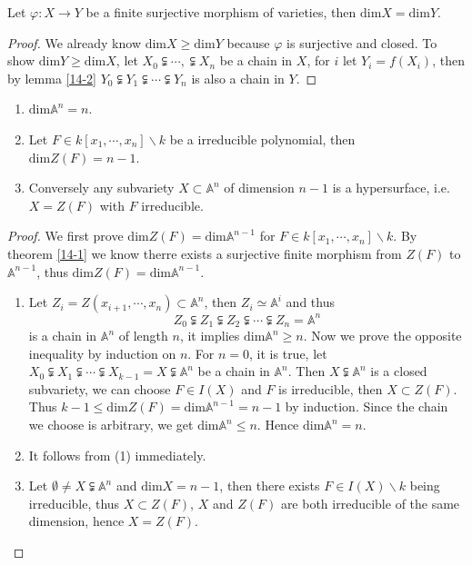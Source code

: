 \begin{theorem}
	Let $ \varphi:X\to Y $ be a finite surjective morphism of varieties, then $ \mathrm{dim}X=\mathrm{dim}Y $.
\end{theorem}
\begin{proof}
	We already know $ \mathrm{dim}X\geq \mathrm{dim}Y $ because $ \varphi $ is surjective and closed. To show $ \mathrm{dim}Y\geq \mathrm{dim}X $, let $ X_0\subsetneqq \cdots,\subsetneqq X_n $ be a chain in $ X $, for $ i $ let $ Y_i=f(X_i) $, then by lemma \ref{14-2} $ Y_0\subsetneqq Y_1\subsetneqq \cdots\subsetneqq Y_n $ is also a chain in $ Y $.
\end{proof}
\begin{theorem}\label{14-3}
  {}
  \noindent
	\begin{enumerate}
		\item $ \mathrm{dim}\mathbb{A}^n=n $.
		\item Let $ F\in k[x_1,\cdots,x_n]\backslash k $ be a irreducible polynomial, then $ \mathrm{dim}Z(F)=n-1 $.
		\item Conversely any subvariety $ X\subset \mathbb{A}^n $ of dimension $ n-1 $ is a hypersurface, i.e. $ X=Z(F) $ with $ F $ irreducible.
	\end{enumerate}
\end{theorem}
\begin{proof}
	We first prove $ \mathrm{dim} Z(F)=\mathrm{dim}\mathbb{A}^{n-1} $ for $ F\in k[x_1,\cdots,x_n]\backslash k $. By theorem \ref{14-1} we know therre exists a surjective finite morphism from $ Z(F) $ to $ \mathbb{A}^{n-1} $, thus $ \mathrm{dim}Z(F)=\mathrm{dim}\mathbb{A}^{n-1}$.
	\begin{enumerate}
		\item Let $ Z_i=Z(x_{i+1},\cdots, x_{n})\subset \mathbb{A}^{n} $, then $ Z_i\simeq \mathbb{A}^i $ and thus
		      $$
			      Z_0\subsetneqq Z_1\subsetneqq Z_2\subsetneqq \cdots\subsetneqq Z_n=\mathbb{A}^n
		      $$
		      is a chain in $ \mathbb{A}^n $ of length $ n $, it implies $ \mathrm{dim}\mathbb{A}^n\geq n $. Now we prove the opposite inequality by induction on $ n $. For $ n=0 $, it is true, let $ X_0\subsetneqq X_1\subsetneqq \cdots\subsetneqq X_{k-1}=X\subsetneqq \mathbb{A}^n $ be a chain in $ \mathbb{A}^n $. Then $ X\subsetneqq \mathbb{A}^{n} $ is a closed subvariety, we can choose $ F\in I(X) $ and $ F $ is irreducible, then $ X\subset Z(F) $. Thus $ k-1\leq \mathrm{dim}Z(F)=\mathrm{dim}\mathbb{A}^{n-1}=n-1 $ by induction. Since the chain we choose is arbitrary, we get $ \mathrm{dim}\mathbb{A}^{n}\leq n $. Hence $ \mathrm{dim}\mathbb{A}^n=n $.
		\item It follows from (1) immediately.
		\item Let $ \emptyset \neq X\subsetneqq \mathbb{A}^n $ and $ \mathrm{dim}X=n-1 $, then there exists $ F\in I(X)\backslash k $ being irreducible, thus $ X\subset Z(F) $, $ X $ and $ Z(F) $ are both irreducible of the same dimension, hence $ X=Z(F) $.
	\end{enumerate}
\end{proof}

